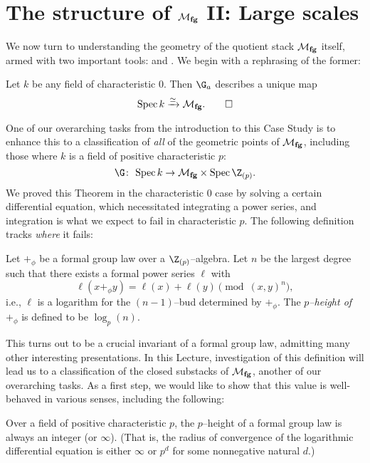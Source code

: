 \section{The structure of \texorpdfstring{$\mathcal{M}_{\mathbf{fg}}$}{Mfg} II: Large scales}\label{MfgII:LargeScales}

We now turn to understanding the geometry of the quotient stack $\mathcal{M}_{\mathbf{fg}}$ itself, armed with two important tools:  and .  We begin with a rephrasing of the former:

\begin{theorem}
Let $k$ be any field of characteristic $0$.  Then $\G_a$ describes a unique map \[\operatorname{Spec} k \xrightarrow{\simeq} \mathcal{M}_{\mathbf{fg}}. \qed\]
\end{theorem}

One of our overarching tasks from the introduction to this Case Study is to enhance this to a classification of \emph{all} of the geometric points of $\mathcal{M}_{\mathbf{fg}}$, including those where $k$ is a field of positive characteristic $p$: \[\G\co \Spec k \to \moduli{fg} \times \Spec \Z_{(p)}.\]  We proved this Theorem in the characteristic $0$ case by solving a certain differential equation, which necessitated integrating a power series, and integration is what we expect to fail in characteristic $p$.  The following definition tracks \emph{where} it fails:
\begin{definition}
Let $+_\phi$ be a formal group law over a $\Z_{(p)}$--algebra.  Let $n$ be the largest degree such that there exists a formal power series $\ell$ with \[\ell(x +_\phi y) = \ell(x) + \ell(y) \pmod{(x, y)^{n}},\] i.e., $\ell$ is a logarithm for the $(n-1)$--bud determined by $+_\phi$.  The \textit{$p$--height of $+_\phi$} is defined to be $\log_p(n)$.
\end{definition}

This turns out to be a crucial invariant of a formal group law, admitting many other interesting presentations.  In this Lecture, investigation of this definition will lead us to a classification of the closed substacks of $\mathcal{M}_{\mathbf{fg}}$, another of our overarching tasks.  As a first step, we would like to show that this value is well-behaved in various senses, including the following:
\begin{lemma}\label{FGLHeightIsAnInteger}
Over a field of positive characteristic $p$, the $p$--height of a formal group law is always an integer (or $\infty$).  (That is, the radius of convergence of the logarithmic differential equation is either $\infty$ or $p^d$ for some nonnegative natural $d$.)
\end{lemma}


